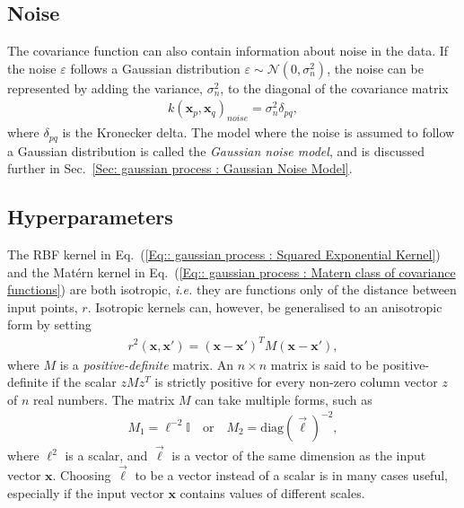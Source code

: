 \documentclass[twoside,english]{uiofysmaster}
\begin{document}
{{\subsection{Noise}\label{Sec:: gaussian process : Noise Covariance Function}


The covariance function can also contain information about noise in the data. If the noise $\varepsilon$ follows a Gaussian distribution $\varepsilon \sim \mathcal{N}(0, \sigma_n^2)$, the noise can be represented by adding the variance, $\sigma_n^2$, to the diagonal of the covariance matrix
\begin{align}
k(\textbf{x}_p, \textbf{x}_q)_{noise} = \sigma^2_n \delta_{pq},
\end{align}
where $\delta_{pq}$ is the Kronecker delta. The model where the noise is assumed to follow a Gaussian distribution is called the \textit{Gaussian noise model}, and is discussed further in Sec.~\ref{Sec: gaussian process : Gaussian Noise Model}. %

\subsection{Hyperparameters}\label{Sec:: gaussian process : Hyperparameters}

The RBF kernel in Eq.~(\ref{Eq:: gaussian process : Squared Exponential Kernel}) and the Mat\'{e}rn kernel in Eq.~(\ref{Eq:: gaussian process : Matern class of covariance functions}) are both isotropic, \textit{i.e.} they are functions only of the distance between input points, $r$. Isotropic kernels can, however, be generalised to an anisotropic form by setting
\begin{align}
r^2(\textbf{x}, \textbf{x}') = (\textbf{x} - \textbf{x}')^T M(\textbf{x} - \textbf{x}'),
\end{align}
where $M$ is a \textit{positive-definite} matrix. An $n \times n$ matrix is said to be positive-definite if the scalar $zMz^T$ is strictly positive for every non-zero column vector $z$ of $n$ real numbers. The matrix $M$ can take multiple forms, such as 
\begin{align}
M_1 = \ell^{-2} \mathbb{I} \quad \mathrm{or} \quad M_2 = \text{diag}(\vec{\ell})^{-2},
\end{align}
where $\ell^2$ is a scalar, and $\vec{\ell}$ is a vector of the same dimension as the input vector $\textbf{x}$. Choosing $\vec{\ell}$ to be a vector instead of a scalar is in many cases useful, especially if the input vector $\textbf{x}$ contains values of different scales.

}}
\end{document}
